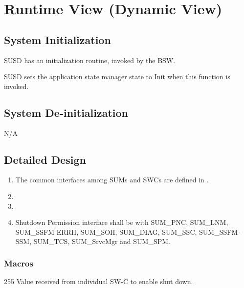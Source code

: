 \chapter{Runtime View (Dynamic View)}

\section{System Initialization}
SUSD has an initialization routine, invoked by the BSW.

{
{}{}{}
{}
{SUSD sets the application state manager state to Init when this function is invoked.}
}
{   }

\section{System De-initialization}
N/A

\section{Detailed Design}
\label{sec:detaileddesign}
\begin{enumerate}
\item The common interfaces among SUMs and SWCs are defined in .
\item {}
{}
\item {}
{}
\item Shutdown Permission interface shall be with SUM_PNC, SUM_LNM, SUM_SSFM-ERRH, SUM_SOH, SUM_DIAG, SUM_SSC, SUM_SSFM-SSM, SUM_TCS, SUM_SrvcMgr and SUM_SPM.
\end{enumerate}

\subsection{Macros}
\label{sec:macros}

{
{255}
{Value received from individual SW-C to enable shut down.}}
{}

